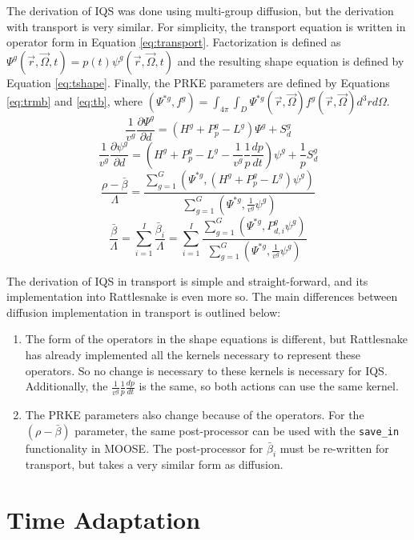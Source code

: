 \documentclass[10pt]{scrartcl}
\newcommand{\be}{\begin{equation}}
\newcommand{\ee}{\end{equation}}
\begin{document}
The derivation of IQS was done using multi-group diffusion, but the derivation with transport is very similar.  For simplicity, the transport equation is written in operator form in Equation \ref{eq:transport}.  Factorization is defined as $\Psi^g(\vec{r},\vec{\Omega},t)=p(t)\psi^g(\vec{r},\vec{\Omega},t)$ and the resulting shape equation is defined by Equation \ref{eq:tshape}.  Finally, the PRKE parameters are defined by Equations \ref{eq:trmb} and \ref{eq:tb}, where $\left(\Psi^{*g},f^g\right) = \int_{4\pi}\int_D \Psi^{*g}(\vec{r},\vec{\Omega})f^g(\vec{r},\vec{\Omega})d^3r d\Omega$.
\be
\frac{1}{v^g}\frac{\partial \Psi^g}{\partial d} = \left(H^g + P_p^g - L^g\right)\Psi^g + S_d^g
\label{eq:transport}
\ee
\be
\frac{1}{v^g}\frac{\partial \psi^g}{\partial d} = \left(H^g + P_p^g - L^g - \frac{1}{v^g}\frac{1}{p}\frac{dp}{dt}\right)\psi^g + \frac{1}{p} S_d^g
\label{eq:tshape}
\ee
\be
\frac{\rho-\bar{\beta}}{\Lambda}=\frac{ \sum_{g=1}^G\left(\Psi^{*g},(H^g+P_p^g-L^g)\psi^g\right)}{\sum_{g=1}^G\left(\Psi^{*g},\frac{1}{v^g}\psi^g\right)}
\label{eq:trmb}
\ee
\be
\frac{\bar{\beta}}{\Lambda}=\sum_{i=1}^I\frac{\bar{\beta}_i}{\Lambda}=\sum_{i=1}^I\frac{\sum_{g=1}^G(\Psi^{*g}, P_{d,i}^g \psi^g)}{\sum_{g=1}^G\left(\Psi^{*g},\frac{1}{v^g}\psi^g\right)}
\label{eq:tb}
\ee

The derivation of IQS in transport is simple and straight-forward, and its implementation into Rattlesnake is even more so.  The main differences between diffusion implementation in transport is outlined below:
\begin{enumerate}
\item The form of the operators in the shape equations is different, but Rattlesnake has already implemented all the kernels necessary to represent these operators.  So no change is necessary to these kernels is necessary for IQS.  Additionally, the $\frac{1}{v^g}\frac{1}{p}\frac{dp}{dt}$ is the same, so both actions can use the same kernel.
\item The PRKE parameters also change because of the operators.  For the $(\rho-\bar{\beta})$ parameter, the same post-processor can be used with the \texttt{save\_in} functionality in MOOSE.  The post-processor for $\bar{\beta}_i$ must be re-written for transport, but takes a very similar form as diffusion.
\end{enumerate}


\section{Time Adaptation}
\end{document}
